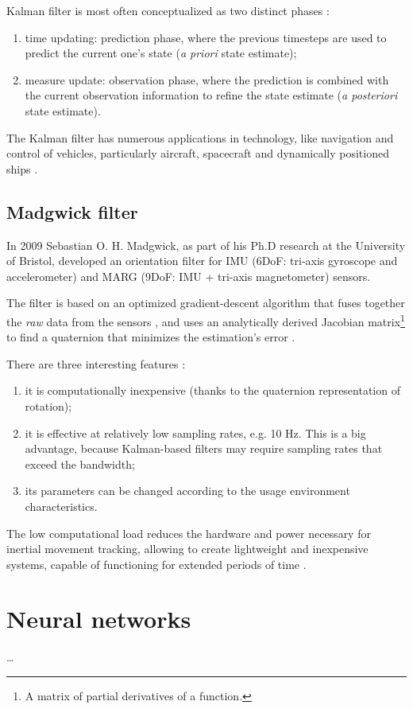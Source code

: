 Kalman filter is most often conceptualized as two distinct phases \cite[12-13]{Ma19}:

\begin{enumerate}
	\item time updating: prediction phase, where the previous timesteps are used to predict the current one's state (\textit{a priori} state estimate);
	\item measure update: observation phase, where the prediction is combined with the current observation information to refine the state estimate (\textit{a posteriori} state estimate).
\end{enumerate}

The Kalman filter has numerous applications in technology, like navigation and control of vehicles, particularly aircraft, spacecraft and dynamically positioned ships \cite{WikipediaKalman}.

\subsection{Madgwick filter} \label{Madgwick filter}
In 2009 Sebastian O. H. Madgwick, as part of his Ph.D research at the University of Bristol, developed an orientation filter for IMU (6DoF: tri-axis gyroscope and accelerometer) and MARG (9DoF: IMU + tri-axis magnetometer) sensors.

The filter is based on an optimized gradient-descent algorithm that fuses together the \textit{raw} data from the sensors \cite{Mad10}, and uses an analytically derived Jacobian matrix\footnote{A matrix of partial derivatives of a function.} to find a quaternion that minimizes the estimation's error \cite{Che12}.
\bigbreak

There are three interesting features \cite{Mad10}:
\begin{enumerate}
	\item it is computationally inexpensive (thanks to the quaternion representation of rotation);
	\item it is effective at relatively low sampling rates, e.g. 10 Hz. This is a big advantage, because Kalman-based filters may require sampling rates that exceed the bandwidth;
	\item its parameters can be changed according to the usage environment characteristics.
\end{enumerate}

The low computational load reduces the hardware and power necessary for inertial movement tracking, allowing to create lightweight and inexpensive systems, capable of functioning for extended periods of time \cite{Mad11}.

\section{Neural networks}
\dots
